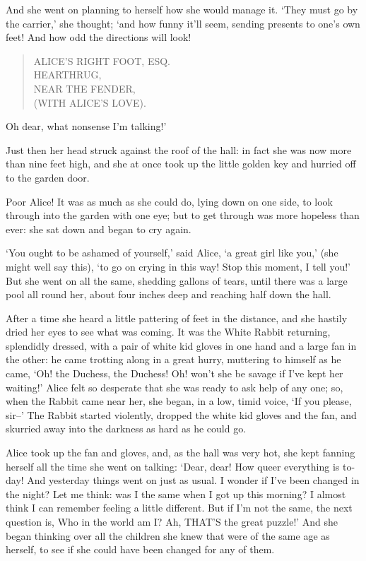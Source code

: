 \documentclass[12pt]{book}
\begin{document}
  And she went on planning to herself how she would manage it.
`They must go by the carrier,' she thought; `and how funny it'll
seem, sending presents to one's own feet!  And how odd the
directions will look!

\begin{verse}
\hspace{1cm}            ALICE'S RIGHT FOOT, ESQ. \\
\hspace{1.5cm}                HEARTHRUG, \\
\hspace{2cm}                    NEAR THE FENDER, \\
\hspace{2.5cm}                        (WITH ALICE'S LOVE).
\end{verse}

Oh dear, what nonsense I'm talking!'

  Just then her head struck against the roof of the hall:  in
fact she was now more than nine feet high, and she at once took
up the little golden key and hurried off to the garden door.

  Poor Alice!  It was as much as she could do, lying down on one
side, to look through into the garden with one eye; but to get
through was more hopeless than ever:  she sat down and began to
cry again.

  `You ought to be ashamed of yourself,' said Alice, `a great
girl like you,' (she might well say this), `to go on crying in
this way!  Stop this moment, I tell you!'  But she went on all
the same, shedding gallons of tears, until there was a large pool
all round her, about four inches deep and reaching half down the
hall.

  After a time she heard a little pattering of feet in the
distance, and she hastily dried her eyes to see what was coming.
It was the White Rabbit returning, splendidly dressed, with a
pair of white kid gloves in one hand and a large fan in the
other:  he came trotting along in a great hurry, muttering to
himself as he came, `Oh! the Duchess, the Duchess! Oh! won't she
be savage if I've kept her waiting!'  Alice felt so desperate
that she was ready to ask help of any one; so, when the Rabbit
came near her, she began, in a low, timid voice, `If you please,
sir--'  The Rabbit started violently, dropped the white kid
gloves and the fan, and skurried away into the darkness as hard
as he could go.

  Alice took up the fan and gloves, and, as the hall was very
hot, she kept fanning herself all the time she went on talking:
`Dear, dear!  How queer everything is to-day!  And yesterday
things went on just as usual.  I wonder if I've been changed in
the night?  Let me think:  was I the same when I got up this
morning?  I almost think I can remember feeling a little
different.  But if I'm not the same, the next question is, Who in
the world am I?  Ah, THAT'S the great puzzle!'  And she began
thinking over all the children she knew that were of the same age
as herself, to see if she could have been changed for any of
them.
\end{document}
